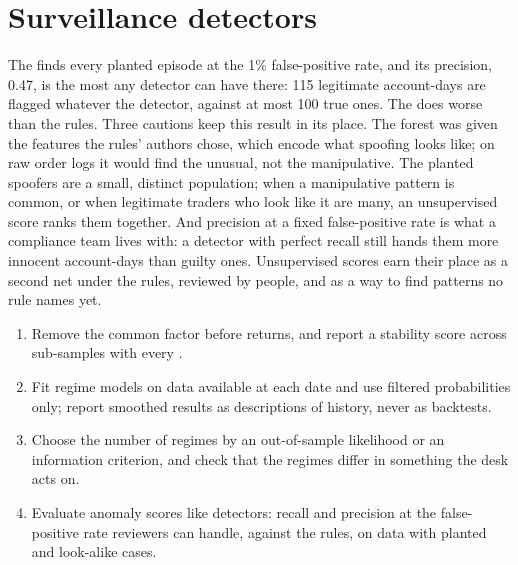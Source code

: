 \section{Surveillance detectors}

The  finds every planted episode at the 1\% false-positive rate, and its precision, 0.47, is the most any
detector can have there: 115 legitimate account-days are flagged whatever the detector, against at most 100 true ones. The
 does worse than the rules. Three cautions keep this result in its place. The forest was given the features the rules'
authors chose, which encode what spoofing looks like; on raw order logs it would find the unusual, not the manipulative. The
planted spoofers are a small, distinct population; when a manipulative pattern is common, or when legitimate traders who look
like it are many, an unsupervised score ranks them together. And precision at a fixed false-positive rate is what a compliance
team lives with: a detector with perfect recall still hands them more innocent account-days than guilty ones. Unsupervised
scores earn their place as a second net under the rules, reviewed by people, and as a way to find patterns no rule names yet.

\begin{method}\label{met:ml:reg:method}
\begin{enumerate}
\item Remove the common factor before  returns, and report a stability score across sub-samples with every
.
\item Fit regime models on data available at each date and use filtered probabilities only; report smoothed results as
descriptions of history, never as backtests.
\item Choose the number of regimes by an out-of-sample likelihood or an information criterion, and check that the regimes differ
in something the desk acts on.
\item Evaluate anomaly scores like detectors: recall and precision at the false-positive rate reviewers can handle, against
the rules, on data with planted and look-alike cases.
\end{enumerate}
\end{method}

